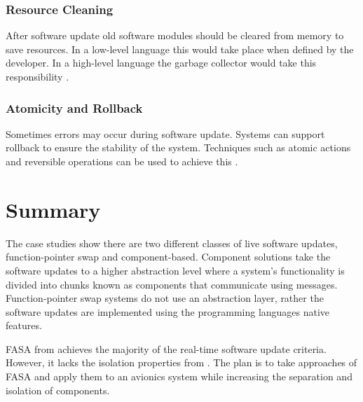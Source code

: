 

\subsubsection{Resource Cleaning}
After software update old software modules should be cleared from memory to save resources. 
In a low-level language this would take place when defined by the developer. In a high-level language the garbage collector would take this responsibility \autocite{mlinaricChallengesDynamicSoftware2020}.

\subsubsection{Atomicity and Rollback}
Sometimes errors may occur during software update. Systems can support rollback to ensure the stability of the system. Techniques such as atomic actions and reversible operations can be used to achieve this \autocite{miedesSurveyDynamicSoftware2012}.

\clearpage



\section{Summary}

The case studies show there are two different classes of live software updates, function-pointer swap and component-based. Component solutions take the software updates to a higher abstraction level where a system's functionality is divided into chunks known as components that communicate using messages. Function-pointer swap systems do not use an abstraction layer, rather the software updates are implemented using the programming languages native features.

FASA from \textcite{wahlerDisruptionfreeSoftwareUpdates2014} achieves the majority of the real-time software update criteria. However, it lacks the isolation properties from \textcite{wahlerDynamicSoftwareUpdates2009}. The plan is to take approaches of FASA and apply them to an avionics system while increasing the separation and isolation of components.
